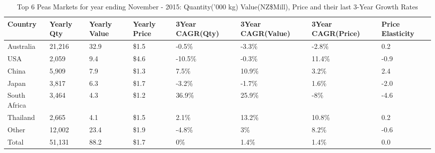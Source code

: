 \begin{table}[ht]
\centering
{\scriptsize
\begin{tabular}[t]{p{1.8cm}>{\hfill}p{1.4cm}>{\hfill}p{1.4cm}>{\hfill}p{1.6cm}>{\hfill}p{1.9cm}>{\hfill}p{2cm}>{\hfill}p{1.9cm}>{\hfill}p{1.5cm}}
 \textbf{Country} & \textbf{Yearly Qty} & \textbf{Yearly Value} & \textbf{Yearly Price} & \textbf{3Year CAGR(Qty)} & \textbf{3Year CAGR(Value)} & \textbf{3Year CAGR(Price)} & \textbf{Price Elasticity} \\
\hline
Australia & 21,216 & 32.9 & \$1.5 & -0.5\% & -3.3\% & -2.8\% & 0.2 \\  
USA & 2,059 & 9.4 & \$4.6 & -10.5\% & -0.3\% & 11.4\% & -0.9 \\  
China & 5,909 & 7.9 & \$1.3 & 7.5\% & 10.9\% & 3.2\% & 2.4 \\  
Japan & 3,817 & 6.3 & \$1.7 & -3.2\% & -1.7\% & 1.6\% & -2.0 \\  
South Africa & 3,464 & 4.3 & \$1.2 & 36.9\% & 25.9\% & -8\% & -4.6 \\  
Thailand & 2,665 & 4.1 & \$1.5 & 2.1\% & 13.2\% & 10.8\% & 0.2 \\  
Other & 12,002 & 23.4 & \$1.9 & -4.8\% & 3\% & 8.2\% & -0.6 \\  
Total & 51,131 & 88.2 & \$1.7 & 0\% & 1.4\% & 1.4\% & 0.0 \\  
\hline
\end{tabular}
}
\caption{\scriptsize Top 6 Peas Markets for year ending November - 2015: Quantity('000 kg) Value(NZ\$Mill), Price and their last 3-Year Growth Rates}
\end{table}

